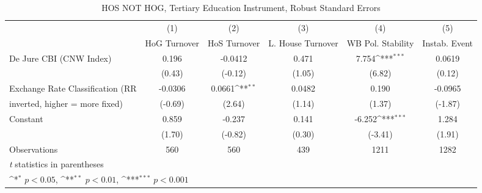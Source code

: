 \begin{table}[htbp]\centering
\def\sym#1{\ifmmode^{#1}\else\(^{#1}\)\fi}
\caption{HOS NOT HOG, Tertiary Education Instrument, Robust Standard Errors \label{NOhoshogIfivs}}
\begin{tabular}{l*{5}{c}}
\toprule
                                        &\multicolumn{1}{c}{(1)}&\multicolumn{1}{c}{(2)}&\multicolumn{1}{c}{(3)}&\multicolumn{1}{c}{(4)}&\multicolumn{1}{c}{(5)}\\
                                        &\multicolumn{1}{c}{HoG Turnover}&\multicolumn{1}{c}{HoS Turnover}&\multicolumn{1}{c}{L. House Turnover}&\multicolumn{1}{c}{WB Pol. Stability}&\multicolumn{1}{c}{Instab. Event}\\
\midrule
De Jure CBI (CNW Index)                 &    0.196         &  -0.0412         &    0.471         &    7.754\sym{***}&   0.0619         \\
                                        &   (0.43)         &  (-0.12)         &   (1.05)         &   (6.82)         &   (0.12)         \\
\addlinespace
Exchange Rate Classification (RR        &  -0.0306         &   0.0661\sym{**} &   0.0482         &    0.190         &  -0.0965         \\
inverted, higher = more fixed)          &  (-0.69)         &   (2.64)         &   (1.14)         &   (1.37)         &  (-1.87)         \\
\addlinespace
Constant                                &    0.859         &   -0.237         &    0.141         &   -6.252\sym{***}&    1.284         \\
                                        &   (1.70)         &  (-0.82)         &   (0.30)         &  (-3.41)         &   (1.91)         \\
\midrule
Observations                            &      560         &      560         &      439         &     1211         &     1282         \\
\bottomrule
\multicolumn{6}{l}{\footnotesize \textit{t} statistics in parentheses}\\
\multicolumn{6}{l}{\footnotesize \sym{*} \(p<0.05\), \sym{**} \(p<0.01\), \sym{***} \(p<0.001\)}\\
\end{tabular}
\end{table}
